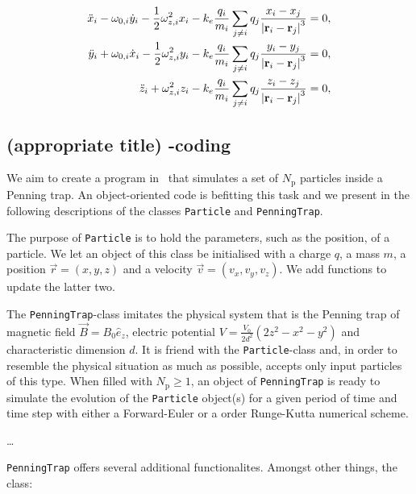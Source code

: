 \begin{align}
    \ddot{x}_i - \omega_{0,i} \dot{y}_i - \frac{1}{2}\omega_{z,i}^2 x_i - k_e \frac{q_i}{m_i} \sum_{j\neq i} q_j \frac{x_i - x_j}{\abs{\mathbf{r}_i - \mathbf{r}_j}^3} =0, \label{eq:p4_diffeq_many_particles_x} \\
    \ddot{y}_i + \omega_{0,i} \dot{x}_i - \frac{1}{2}\omega_{z,i}^2 y_i - k_e \frac{q_i}{m_i} \sum_{j\neq i} q_j \frac{y_i - y_j}{\abs{\mathbf{r}_i - \mathbf{r}_j}^3} =0, \label{eq:p4_diffeq_many_particles_y} \\ 
    \ddot{z}_i + \omega_{z,i}^2 z_i - k_e \frac{q_i}{m_i} \sum_{j\neq i} q_j \frac{z_i - z_j}{\abs{\mathbf{r}_i - \mathbf{r}_j}^3} =0, \label{eq:p4_diffeq_many_particles_z}
\end{align}







\subsection{(appropriate title) -coding}

We aim to create a program in \CC\, that simulates a set of $N_\mathrm{p}$ particles inside a Penning trap. An object-oriented code is befitting this task and we present in the following descriptions of the classes \verb|Particle| and \verb|PenningTrap|.

The purpose of \texttt{Particle} is to hold the parameters, such as the position, of a particle. We let an object of this class be initialised with a charge $q$, a mass $m$, a position $\vec{r} = (x,y,z)$ and a velocity $\vec{v} = (v_x, v_y, v_z)$. We add functions to update the latter two. 

The \texttt{PenningTrap}-class imitates the physical system that is the Penning trap of magnetic field $\vec{B}=B_0\hat{e}_z$, electric potential $V = \frac{V_0}{2d^2} (2z^2-x^2-y^2)$ and characteristic dimension $d$. It is friend with the \texttt{Particle}-class and, in order to resemble the physical situation as much as possible, accepts only input particles of this type. When filled with $N_\mathrm{p}\geq 1$, an object of \texttt{PenningTrap} is ready to simulate the evolution of the \texttt{Particle} object(s) for a given period of time and time step with either a Forward-Euler or a  order Runge-Kutta numerical scheme. 

\dots


\verb|PenningTrap| offers several additional functionalites. Amongst other things, the class:

